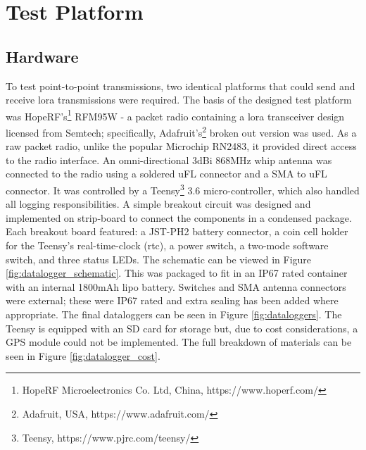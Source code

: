 \section{Test Platform}
\subsection{Hardware}
To test point-to-point transmissions, two identical platforms that could send and receive \ac{lora} transmissions were required. The basis of the designed test platform was HopeRF's\footnote{HopeRF Microelectronics Co. Ltd, China, https://www.hoperf.com/} RFM95W - a packet radio containing a \ac{lora} transceiver design licensed from Semtech; specifically, Adafruit's\footnote{Adafruit, USA, https://www.adafruit.com/} broken out version was used. As a raw packet radio, unlike the popular Microchip RN2483, it provided direct access to the radio interface. An omni-directional 3dBi 868MHz whip antenna was connected to the radio using a soldered uFL connector and a SMA to uFL connector. It was controlled by a Teensy\footnote{Teensy, https://www.pjrc.com/teensy/} 3.6 micro-controller, which also handled all logging responsibilities. A simple breakout circuit was designed and implemented on strip-board to connect the components in a condensed package. Each breakout board featured: a JST-PH2 battery connector, a coin cell holder for the Teensy's real-time-clock (\ac{rtc}), a power switch, a two-mode software switch, and three status LEDs. The schematic can be viewed in Figure \ref{fig:datalogger_schematic}. This was packaged to fit in an IP67 rated container with an internal 1800mAh \ac{lipo} battery. Switches and SMA antenna connectors were external; these were IP67 rated and extra sealing has been added where appropriate. The final dataloggers can be seen in Figure \ref{fig:dataloggers}. The Teensy is equipped with an SD card for storage but, due to cost considerations, a GPS module could not be implemented. The full breakdown of materials can be seen in Figure \ref{fig:datalogger_cost}.

